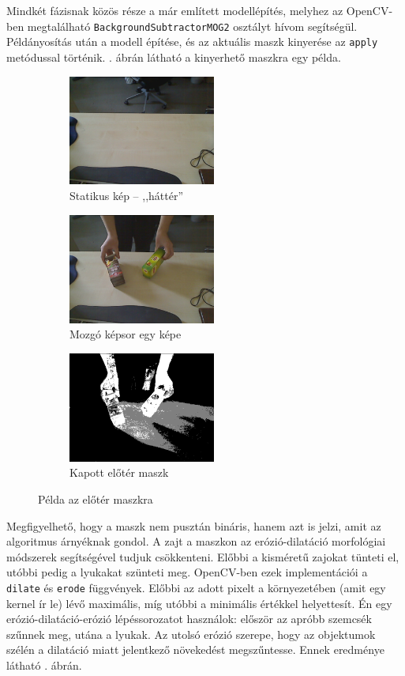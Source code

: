 Mindkét fázisnak közös része a már említett modellépítés, melyhez az OpenCV-ben megtalálható \texttt{BackgroundSubtractorMOG2} osztályt \cite{opencv-mog} hívom segítségül. Példányosítás után a modell építése, és az aktuális maszk kinyerése az \texttt{apply} metódussal történik. . ábrán látható a kinyerhető maszkra egy példa.

\begin{figure}[tbh]
\centering
\begin{subfigure}[b]{.32\linewidth}
	\centering
	\includegraphics[width=137pt]{figures/image230.png}
	\caption{Statikus kép -- ,,háttér''}
  \end{subfigure}
\begin{subfigure}[b]{.32\linewidth}
	\centering
	\includegraphics[width=137pt]{figures/image343.png}
	\caption{Mozgó képsor egy képe}
  \end{subfigure}
\begin{subfigure}[b]{.32\linewidth}
	\centering
	\includegraphics[width=137pt]{figures/mask343.png}
	\caption{Kapott előtér maszk}
  \end{subfigure}
\caption{Példa az előtér maszkra \label{fig:my_mog2}}
\end{figure}

Megfigyelhető, hogy a maszk nem pusztán bináris, hanem azt is jelzi, amit az algoritmus árnyéknak gondol. A zajt a maszkon az erózió-dilatáció morfológiai módszerek segítségével tudjuk csökkenteni. Előbbi a kisméretű zajokat tünteti el, utóbbi pedig a lyukakat szünteti meg. OpenCV-ben ezek implementációi a \texttt{dilate} és \texttt{erode} függvények. Előbbi az adott pixelt a környezetében (amit egy kernel ír le) lévő maximális, míg utóbbi a minimális értékkel helyettesít. Én egy erózió-dilatáció-erózió lépéssorozatot használok: először az apróbb szemcsék szűnnek meg, utána a lyukak. Az utolsó erózió szerepe, hogy az objektumok szélén a dilatáció miatt jelentkező növekedést megszűntesse. Ennek eredménye látható . ábrán.

